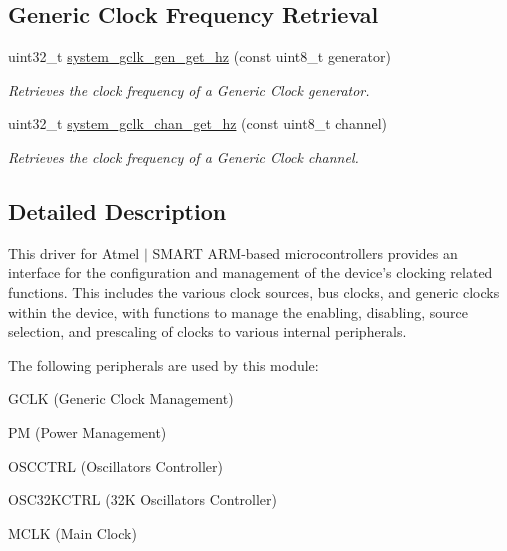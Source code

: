 \subsection*{Generic Clock Frequency Retrieval}
\begin{DoxyCompactItemize}
\item 
uint32\+\_\+t \hyperlink{group__asfdoc__sam0__system__clock__group_gaf5cd7b482ee14413084669c32eef84cb}{system\+\_\+gclk\+\_\+gen\+\_\+get\+\_\+hz} (const uint8\+\_\+t generator)
\begin{DoxyCompactList}\small\item\em Retrieves the clock frequency of a Generic Clock generator. \end{DoxyCompactList}\item 
uint32\+\_\+t \hyperlink{group__asfdoc__sam0__system__clock__group_ga6683b93425b58d6c94b850419dd4c860}{system\+\_\+gclk\+\_\+chan\+\_\+get\+\_\+hz} (const uint8\+\_\+t channel)
\begin{DoxyCompactList}\small\item\em Retrieves the clock frequency of a Generic Clock channel. \end{DoxyCompactList}\end{DoxyCompactItemize}


\subsection{Detailed Description}
This driver for Atmel\textregistered{} $\vert$ S\+M\+A\+R\+T A\+R\+M\textregistered{}-\/based microcontrollers provides an interface for the configuration and management of the device's clocking related functions. This includes the various clock sources, bus clocks, and generic clocks within the device, with functions to manage the enabling, disabling, source selection, and prescaling of clocks to various internal peripherals.

The following peripherals are used by this module\+:


\begin{DoxyItemize}
\item G\+C\+L\+K (Generic Clock Management)
\item P\+M (Power Management)
\item O\+S\+C\+C\+T\+R\+L (Oscillators Controller)
\item O\+S\+C32\+K\+C\+T\+R\+L (32\+K Oscillators Controller)
\item M\+C\+L\+K (Main Clock)
\end{DoxyItemize}

